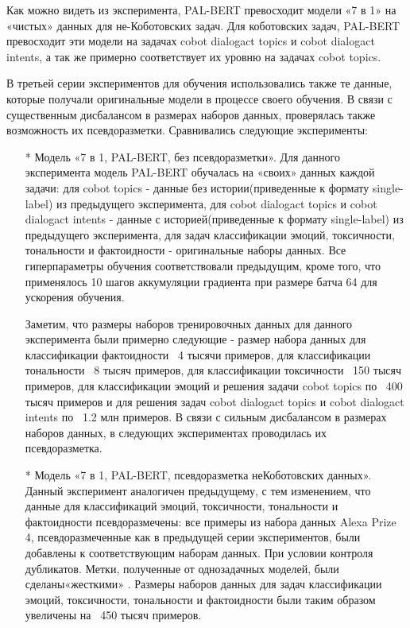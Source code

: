 Как можно видеть из эксперимента, PAL-BERT превосходит модели «7 в 1» на «чистых» данных для не-Коботовских задач. Для коботовских задач, PAL-BERT превосходит эти модели на задачах cobot dialogact topics и cobot dialogact intents, а так же примерно соответствует их уровню на задачах cobot topics.

В третьей серии экспериментов для обучения использовались также те данные, которые получали оригинальные модели в процессе своего обучения. В связи с существенным дисбалансом в размерах наборов данных, проверялась также возможность их псевдоразметки. Сравнивались следующие эксперименты:
\begin{itemize}
\item[*] Модель «7 в 1, PAL-BERT, без псевдоразметки». Для данного эксперимента модель PAL-BERT обучалась на «своих» данных каждой задачи: для cobot topics - данные без истории(приведенные к формату single-label) из предыдущего эксперимента, для cobot dialogact topics и cobot dialogact intents - данные с историей(приведенные к формату single-label) из предыдущего эксперимента, для задач классификации эмоций, токсичности, тональности и фактоидности - оригинальные наборы данных. Все гиперпараметры обучения соответствовали предыдущим, кроме того, что применялось 10 шагов аккумуляции градиента при размере батча 64 для ускорения обучения.

Заметим, что размеры наборов тренировочных данных для данного эксперимента были примерно следующие - размер набора данных для классификации фактоидности ~4 тысячи примеров, для классификации тональности ~8 тысяч примеров, для классификации токсичности ~150 тысяч примеров, для классификации эмоций и решения задачи cobot topics по ~400 тысяч примеров и для решения задач cobot dialogact topics и cobot dialogact intents по ~1.2 млн примеров. В связи с сильным дисбалансом в размерах наборов данных, в следующих экспериментах проводилась их псевдоразметка.

\item[*] Модель «7 в 1, PAL-BERT, псевдоразметка неКоботовских данных». Данный эксперимент аналогичен предыдущему, с тем изменением, что данные для классификаций эмоций, токсичности, тональности и фактоидности псевдоразмечены: все примеры из набора данных Alexa Prize 4, псевдоразмеченные как в предыдущей серии экспериментов, были добавлены к соответствующим наборам данных. При условии контроля дубликатов. Метки, полученные от однозадачных моделей, были сделаны«жесткими» . Размеры наборов данных для задач классификации эмоций, токсичности, тональности и фактоидности были таким образом увеличены на ~450 тысяч примеров.


\end{itemize}
